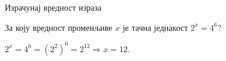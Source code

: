 \documentclass[11pt,a5paper,twoside,addpoints,noanswers]{exam} %
\newcommand{\variant}[4]{#1}
\begin{document}
\begin{questions}
\question %
 Израчунај вредност израза
 \begin{multicols}{2}
 \end{multicols}

\begin{solution}[\stretch 2]
\begin{multicols}{2}
\end{multicols}
\end{solution}

\question[3] %
 За коју вредност променљиве $x$ је тачна једнакост
 \(
  \variant
   {2^x = 4^6}
   {(6^{2x})^3 = 6^{48}}
   {(5^2)^{3x} = 5^{30}}
   {8^x = 2^{27}}
 \)?
 
\begin{solution}[\stretch 2]
$\variant
	{2^x=4^6=(2^2)^6=2^{12}\Rightarrow x=12}
	{(6^{2x})^3=6^{6x}=6^{48}\Rightarrow 6x=48\Rightarrow x=8}
	{(5^2)^{3x}=5^{6x}=5^{30}\Rightarrow 6x=30\Rightarrow x=5}
	{8^x=(2^3)^x=2^{3x}=2^{27}\Rightarrow 3x=27\Rightarrow x=9}
$.
\end{solution}


\end{questions}
\end{document}
